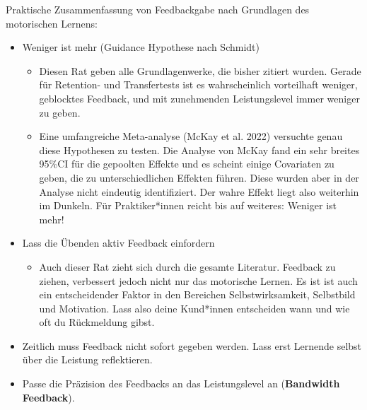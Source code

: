 \documentclass[
  letterpaper,
  DIV=11,
  numbers=noendperiod]{scrreprt}
\providecommand{\tightlist}{%
  \setlength{\itemsep}{0pt}\setlength{\parskip}{0pt}}
\begin{document}
Praktische Zusammenfassung von Feedbackgabe nach Grundlagen des
motorischen Lernens:

\begin{itemize}
\tightlist
\item
  Weniger ist mehr (Guidance Hypothese nach Schmidt)

  \begin{itemize}
  \tightlist
  \item
    Diesen Rat geben alle Grundlagenwerke, die bisher zitiert wurden.
    Gerade für Retention- und Transfertests ist es wahrscheinlich
    vorteilhaft weniger, geblocktes Feedback, und mit zunehmenden
    Leistungslevel immer weniger zu geben.
  \item
    Eine umfangreiche Meta-analyse (McKay et al. 2022) versuchte genau
    diese Hypothesen zu testen. Die Analyse von McKay fand ein sehr
    breites 95\%CI für die gepoolten Effekte und es scheint einige
    Covariaten zu geben, die zu unterschiedlichen Effekten führen. Diese
    wurden aber in der Analyse nicht eindeutig identifiziert. Der wahre
    Effekt liegt also weiterhin im Dunkeln. Für Praktiker*innen reicht
    bis auf weiteres: Weniger ist mehr!
  \end{itemize}
\item
  Lass die Übenden aktiv Feedback einfordern

  \begin{itemize}
  \tightlist
  \item
    Auch dieser Rat zieht sich durch die gesamte Literatur. Feedback zu
    ziehen, verbessert jedoch nicht nur das motorische Lernen. Es ist
    ist auch ein entscheidender Faktor in den Bereichen
    Selbstwirksamkeit, Selbstbild und Motivation. Lass also deine
    Kund*innen entscheiden wann und wie oft du Rückmeldung gibst.
  \end{itemize}
\item
  Zeitlich muss Feedback nicht sofort gegeben werden. Lass erst Lernende
  selbst über die Leistung reflektieren.
\item
  Passe die Präzision des Feedbacks an das Leistungslevel an
  (\textbf{Bandwidth Feedback}).


\end{itemize}
\end{document}
